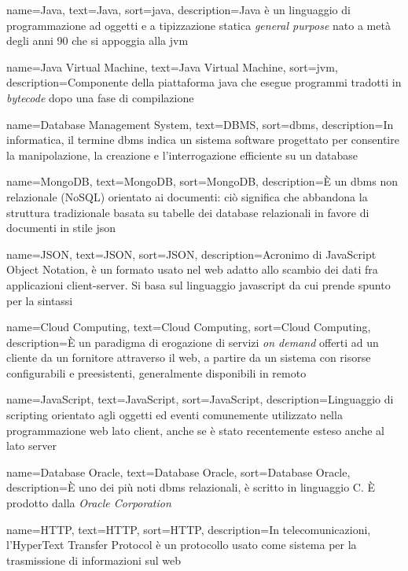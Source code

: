 {
    name=Java,
    text=Java,
    sort=java,
    description={Java è un linguaggio di programmazione ad oggetti e a tipizzazione statica \emph{general purpose} nato a metà degli anni 90 che si appoggia alla \gls{jvm}}
}

{
    name=Java Virtual Machine,
    text=Java Virtual Machine,
    sort=jvm,
    description={Componente della piattaforma \gls{java} che esegue programmi tradotti in \emph{bytecode} dopo una fase di compilazione}
}

{
    name=Database Management System,
    text=DBMS,
    sort=dbms,
    description={In informatica, il termine \gls{dbms} indica un sistema software progettato per consentire la manipolazione, la creazione e l'interrogazione efficiente su un database}
}

{
    name=MongoDB,
    text=MongoDB,
    sort=MongoDB,
    description={È un \gls{dbms} non relazionale (NoSQL) orientato ai documenti: ciò significa che abbandona la struttura tradizionale basata su tabelle dei database relazionali in favore di documenti in stile \gls{json}}
}

{
    name=JSON,
    text=JSON,
    sort=JSON,
    description={Acronimo di JavaScript Object Notation, è un formato usato nel web adatto allo scambio dei dati fra applicazioni client-server. Si basa sul linguaggio \gls{javascript} da cui prende spunto per la sintassi}
}

{
    name=Cloud Computing,
    text=Cloud Computing,
    sort=Cloud Computing,
    description={È un paradigma di erogazione di servizi \emph{on demand} offerti ad un cliente da un fornitore attraverso il web, a partire da
    un sistema con risorse configurabili e preesistenti, generalmente disponibili in remoto}
}

{
    name=JavaScript,
    text=JavaScript,
    sort=JavaScript,
    description={Linguaggio di scripting orientato agli oggetti ed eventi comunemente utilizzato nella programmazione web lato client, anche se è stato recentemente esteso anche al lato server}
}

{
    name=Database Oracle,
    text=Database Oracle,
    sort=Database Oracle,
    description={È uno dei più noti \gls{dbms} relazionali, è scritto in linguaggio C. È prodotto dalla \emph{Oracle Corporation}}
}

{
    name=HTTP,
    text=HTTP,
    sort=HTTP,
    description={In telecomunicazioni, l'HyperText Transfer Protocol è un protocollo usato come sistema per la trasmissione di informazioni sul web}
}


